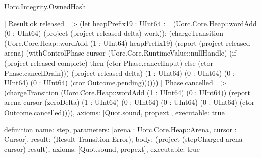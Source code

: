 \begin{lexlean}{Uorc.Integrity.OwnedHash}
\begin{semanticmodule}
{      | Result.ok released => (let heapPrefix19 : UInt64 := (Uorc.Core.Heap::wordAdd (0 : UInt64) (project (project released delta) work)); (chargeTransition (Uorc.Core.Heap::wordAdd (1 : UInt64) heapPrefix19) (report (project released arena) (withControlPhase cursor (Uorc.Core.RuntimeValue::nullHandle) (if (project released complete) then (ctor Phase.cancelInput) else (ctor Phase.cancelDrain))) (project released delta) (1 : UInt64) (0 : UInt64) (0 : UInt64) (0 : UInt64) (ctor Outcome.pending))))))
    | Phase.cancelled => (chargeTransition (Uorc.Core.Heap::wordAdd (1 : UInt64) (0 : UInt64)) (report arena cursor (zeroDelta) (1 : UInt64) (0 : UInt64) (0 : UInt64) (0 : UInt64) (ctor Outcome.cancelled)))),
  axioms: [Quot.sound, propext],
  executable: true
}

definition{
  name: step,
  parameters: [arena : Uorc.Core.Heap::Arena, cursor : Cursor],
  result: (Result Transition Error),
  body: (project (stepCharged arena cursor) result),
  axioms: [Quot.sound, propext],
  executable: true
}


\end{semanticmodule}
\end{lexlean}
